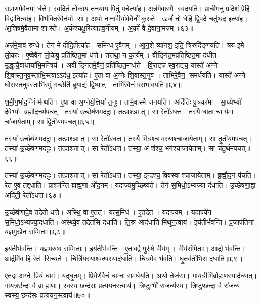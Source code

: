 सप्रा॑णमे॒वैन॒मा ध॑त्ते। स्व॒दि॒तं तो॒काय॒ तन॑याय पि॒तुं प॒चेत्या॑ह। अन्न॑मे॒वास्मै स्वदयति। प्राची॒मनु॑ प्र॒दिशं॒ प्रेहि॑ वि॒द्वानित्या॑ह। विभ॑क्तिरे॒वैन॑यो॒ सा। अथो॒ नाना॑वीर्यावे॒वैनौ॑ कुरुते। ऊर्जं॑ नो धेहि द्वि॒पदे॒ चतु॑ष्पद॒ इत्या॑ह। आ॒शिष॑मे॒वैतामा शास्ते। अ॒र्कश्चक्षु॒रित्या॑हव॒नीयम्। अ॒र्को वै दे॒वाना॒मन्नम्॥६३॥

अन्न॑मे॒वाव॑ रुन्धे। तेन॑ मे दीदि॒हीत्या॑ह। समि॑न्ध ए॒वैनम्। आ॒न॒शे व्या॑नश॒ इति॒ त्रिरुदि॑ङ्गयति। त्रय॑ इ॒मे लो॒काः। ए॒ष्वे॑वैनं॑ लो॒केषु॒ प्रति॑ष्ठित॒मा ध॑त्ते। तत्तथा॒ न का॒र्यम्। वीङ्गि॑त॒मप्र॑तिष्ठित॒मा द॑धीत। उ॒द्धृत्यै॒वाधाया॑भि॒मन्त्रिय॑। अवीङ्गितमे॒वैनं॒ प्रति॑ष्ठित॒माध॑त्ते। वि॒राट्च॑ स्व॒राट्च॒ यास्ते॑ अग्ने शि॒वास्त॒नुव॒स्ताभि॒स्त्वाऽऽद॑ध॒ इत्या॑ह। ए॒ता वा अ॒ग्नेः शि॒वास्त॒नुव॑। ताभि॑रे॒वैन॒ सम॑र्धयति। यास्ते॑ अग्ने घो॒रास्त॒नुव॒स्ताभि॑र॒मुं ग॒च्छेति॑ ब्रूया॒द्यं द्वि॒ष्यात्। ताभि॑रे॒वैनं॒ परा॑भावयति॥६४॥\anuvakamend[लो॒को॑ऽसृजतैन॒माध॑त्तेऽन्वाहार्य॒पच॑नं दे॒वाना॒मन्न॑मेनं॒ प्रति॑ष्ठित॒माध॑त्ते॒ पञ्च॑ च]

श॒मी॒ग॒र्भाद॒ग्निं म॑न्थति। ए॒षा वा अ॒ग्नेर्य॒ज्ञिया॑ त॒नूः। तामे॒वास्मै॑ जनयति। अदि॑तिः पु॒त्रका॑मा। सा॒ध्येभ्यो॑ दे॒वेभ्यो ब्रह्मौद॒नम॑पचत्। तस्या॑ उ॒च्छेष॑णमददुः। तत्प्राश्ञात्। सा रेतो॑ऽधत्त। तस्यै॑ धा॒ता चार्य॒मा चा॑जायेताम्। सा द्वि॒तीय॑मपचत्॥६५॥

तस्या॑ उ॒च्छेष॑णमददुः। तत्प्राश्ञात्। सा रेतो॑ऽधत्त। तस्यै॑ मि॒त्रश्च॒ वरु॑णश्चाजायेताम्। सा तृ॒तीय॑मपचत्। तस्या॑ उ॒च्छेष॑णमददुः। तत्प्राश्ञात्। सा रेतो॑ऽधत्त। तस्या॒ अश॑श्च॒ भग॑श्चाजायेताम्। सा च॑तु॒र्थम॑पचत्॥६६॥

तस्या॑ उ॒च्छेष॑णमददुः। तत्प्राश्ञात्। सा रेतो॑ऽधत्त। तस्या॒ इन्द्र॑श्च॒ विव॑स्वाश्चाजायेताम्। ब्र॒ह्मौ॒द॒नं प॑चति। रेत॑ ए॒व तद्द॑धाति। प्राश्ञ॑न्ति ब्राह्म॒णा ओ॑द॒नम्। यदाज्य॑मु॒च्छिष्य॑ते। तेन॑ स॒मिधो॒ऽभ्यज्या द॑धाति। उ॒च्छेष॑णा॒द्वा अदि॑ती॒ रेतो॑ऽधत्त॥६७॥

उ॒च्छेष॑णादे॒व तद्रेतो॑ धत्ते। अस्थि॒ वा ए॒तत्। यत्स॒मिध॑। ए॒तद्रेत॑। यदाज्यम्। यदाज्ये॑न स॒मिधो॒ऽभ्यज्या॒दधा॑ति। अस्थ्ये॒व तद्रेत॑सि दधाति। ति॒स्र आद॑धाति मिथुन॒त्वाय॑। इय॑तीर्भवन्ति। प्र॒जाप॑तिना यज्ञमु॒खेन॒ सम्मि॑ताः॥६८॥

इय॑तीर्भवन्ति। य॒ज्ञ॒प॒रुषा॒ सम्मि॑ताः। इय॑तीर्भवन्ति। ए॒ताव॒द्वै पुरु॑षे वी॒र्यम्। वी॒र्य॑संमिताः। आ॒र्द्रा भ॑वन्ति। आ॒र्द्रमि॑व॒ हि रेत॑ सि॒च्यते। चित्रि॑यस्याश्व॒त्थस्याद॑धाति। चि॒त्रमे॒व भ॑वति। घृ॒तव॑तीभि॒रा द॑धाति॥६९॥

ए॒तद्वा अ॒ग्नेः प्रि॒यं धाम॑। यद्घृ॒तम्। प्रि॒येणै॒वैनं॒ धाम्ना॒ सम॑र्धयति। अथो॒ तेज॑सा। गा॒य॒त्रीभि॑र्ब्राह्म॒णस्याद॑ध्यात्। गा॒य॒त्रछ॑न्दा॒ वै ब्राह्म॒णः। स्वस्य॒ छन्द॑सः प्रत्ययन॒स्त्वाय॑। त्रि॒ष्टुग्भी॑ राज॒न्य॑स्य। त्रि॒ष्टुप्छ॑न्दा॒ वै रा॑ज॒न्य॑। स्वस्य॒ छन्द॑सः प्रत्ययन॒स्त्वाय॑॥७०॥


